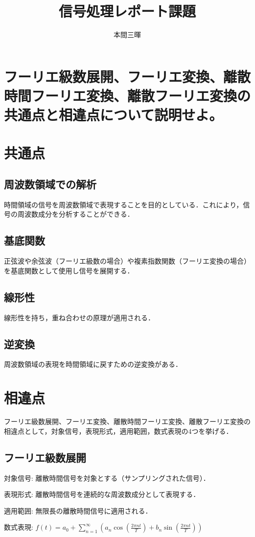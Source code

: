 \documentclass[titlepage,a4paper]{jsarticle}
\title{信号処理レポート課題}
\author{本間三暉}
\begin{document}
\maketitle
\section{フーリエ級数展開、フーリエ変換、離散時間フーリエ変換、離散フーリエ変換の共通点と相違点について説明せよ。}
\section*{共通点}
\subsection{周波数領域での解析}
時間領域の信号を周波数領域で表現することを目的としている．これにより，信号の周波数成分を分析することができる．
\subsection{基底関数}
正弦波や余弦波（フーリエ級数の場合）や複素指数関数（フーリエ変換の場合）を基底関数として使用し信号を展開する．
\subsection{線形性}
線形性を持ち，重ね合わせの原理が適用される．
\subsection{逆変換}
周波数領域の表現を時間領域に戻すための逆変換がある．
\setcounter{subsection}{0}
\section*{相違点}
フーリエ級数展開、フーリエ変換、離散時間フーリエ変換、離散フーリエ変換の相違点として，対象信号，表現形式，適用範囲，数式表現の4つを挙げる．
\subsection{フーリエ級数展開}
対象信号: 離散時間信号を対象とする（サンプリングされた信号）．

表現形式: 離散時間信号を連続的な周波数成分として表現する．

適用範囲: 無限長の離散時間信号に適用される．

数式表現: $f(t) = a_0 + \sum_{n=1}^{\infty} \left( a_n \cos\left( \frac{2\pi nt}{T} \right) + b_n \sin\left( \frac{2\pi nt}{T} \right) \right)$
\end{document}
